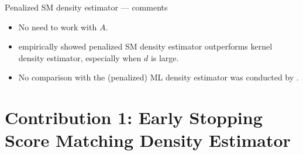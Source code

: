 \documentclass[aspectratio=169,xcolor=dvipsnames]{beamer}
\newcommand{\SM}{\mathrm{SM}}
\begin{document}
\begin{frame}{Penalized SM density estimator --- comments}

	
	\begin{itemize}
		\item No need to work with $A$. 
		\vspace{5pt}
		\item \textcite{Sriperumbudur-density-estimation-inf-exp-family} empirically showed penalized SM density estimator outperforms kernel density estimator, especially when $d$ is large. 
		\vspace{5pt}
		\item No comparison with the (penalized) ML density estimator was conducted by \textcite{Sriperumbudur-density-estimation-inf-exp-family}. 
	\end{itemize}
	
\end{frame}


\section{Contribution 1: Early Stopping Score Matching Density Estimator}
\end{document}
